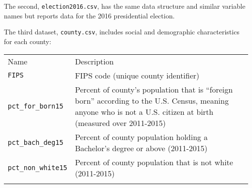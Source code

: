 \documentclass[]{article}
\begin{document}
The second, \texttt{election2016.csv}, has the same data structure and
similar variable names but reports data for the 2016 presidential
election.

The third dataset, \texttt{county.csv}, includes social and demographic
characteristics for each county:

\begin{longtable}[c]{@{}ll@{}}
\toprule\addlinespace
\begin{minipage}[b]{0.20\columnwidth}\raggedright
Name
\end{minipage} & \begin{minipage}[b]{0.74\columnwidth}\raggedright
Description
\end{minipage}
\\\addlinespace
\midrule\endhead
\begin{minipage}[t]{0.20\columnwidth}\raggedright
\texttt{FIPS}
\end{minipage} & \begin{minipage}[t]{0.74\columnwidth}\raggedright
FIPS code (unique county identifier)
\end{minipage}
\\\addlinespace
\begin{minipage}[t]{0.20\columnwidth}\raggedright
\texttt{pct\_for\_born15}
\end{minipage} & \begin{minipage}[t]{0.74\columnwidth}\raggedright
Percent of county's population that is ``foreign born'' according to the
U.S. Census, meaning anyone who is not a U.S. citizen at birth (measured
over 2011-2015)
\end{minipage}
\\\addlinespace
\begin{minipage}[t]{0.20\columnwidth}\raggedright
\texttt{pct\_bach\_deg15}
\end{minipage} & \begin{minipage}[t]{0.74\columnwidth}\raggedright
Percent of county population holding a Bachelor's degree or above
(2011-2015)
\end{minipage}
\\\addlinespace
\begin{minipage}[t]{0.20\columnwidth}\raggedright
\texttt{pct\_non\_white15}
\end{minipage} & \begin{minipage}[t]{0.74\columnwidth}\raggedright
Percent of county population that is not white (2011-2015)
\end{minipage}
\\\addlinespace

\end{longtable}
\end{document}
